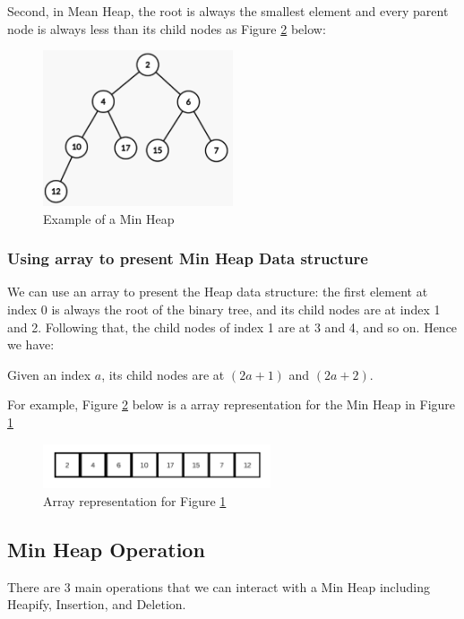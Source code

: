 \documentclass{assignment}
\begin{document}
Second, in Mean Heap, the root is always the smallest element and every parent node is always less than its child nodes as Figure \ref{fig:fig16} below:

\begin{figure}[h]
    \centering
    \includegraphics[width=0.5\textwidth]{./assets/MinHeapEx.png}
    \caption{Example of a Min Heap}
    \label{fig:fig15}
\end{figure}

\subsubsection{Using array to present Min Heap Data structure}
We can use an array to present the Heap data structure: the first element at index 0 is always the root of the binary tree, and its child nodes are at index 1 and 2. Following that, the child nodes of index 1 are at 3 and 4, and so on. Hence we have:

Given an index $a$, its child nodes are at $(2a + 1)$ and $(2a + 2)$. 

For example, Figure \ref{fig:fig16} below is a array representation for the Min Heap in Figure \ref{fig:fig15}

\begin{figure}[h]
    \centering
    \includegraphics[width=0.6\textwidth]{./assets/exArray.png}
    \caption{Array representation for Figure \ref{fig:fig15}}
    \label{fig:fig16}
\end{figure}


\subsection{Min Heap Operation}
There are 3 main operations that we can interact with a Min Heap including Heapify, Insertion, and Deletion.
\end{document}
